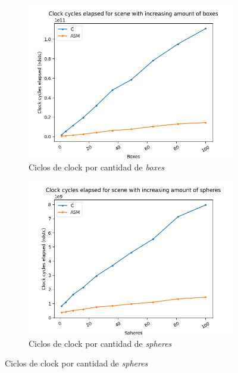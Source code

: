 \begin{figure}[H]
  \centering
  \begin{subfigure}[b]{0.45\textwidth}
    \centering
    \includegraphics[width=\textwidth]{./imgs/exp3-box-c_vs_asm.png}
    \caption{Ciclos de clock por cantidad de \textit{boxes}}
  \end{subfigure}
  \hfill
  \begin{subfigure}[b]{0.45\textwidth}
    \centering
    \includegraphics[width=\textwidth]{./imgs/exp3-sphere-c_vs_asm.png}
    \caption{Ciclos de clock por cantidad de \textit{spheres}}
  \end{subfigure}


\end{figure}
